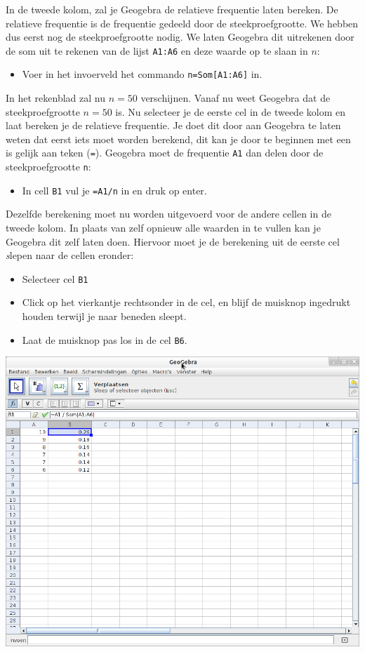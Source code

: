 \documentclass[12pt,twoside]{article}
\begin{document}
In de tweede kolom, zal je Geogebra de relatieve frequentie laten bereken. De relatieve frequentie is de frequentie gedeeld door de steekproefgrootte. We hebben dus eerst nog de steekproefgrootte nodig. We laten Geogebra dit uitrekenen door de som uit te rekenen van de lijst \verb#A1:A6# en deze waarde op te slaan in $n$:
\begin{itemize}
  \item Voer in het invoerveld het commando \verb#n=Som[A1:A6]# in.
\end{itemize}

In het rekenblad zal nu $n=50$ verschijnen. Vanaf nu weet Geogebra dat de steekproefgrootte $n=50$ is. Nu selecteer je de eerste cel in de tweede kolom en laat bereken je de relatieve frequentie. Je doet dit door aan Geogebra te laten weten dat eerst iets moet worden berekend, dit kan je door te beginnen met een is gelijk aan teken (\verb#=#). Geogebra moet de frequentie \verb#A1# dan delen door de steekproefgrootte \verb#n#:
\begin{itemize}
  \item In cell \verb#B1# vul je \verb#=A1/n# in en druk op enter.
\end{itemize}

Dezelfde berekening moet nu worden uitgevoerd voor de andere cellen in de tweede kolom. In plaats van zelf opnieuw alle waarden in te vullen kan je Geogebra dit zelf laten doen. Hiervoor moet je de berekening uit de eerste cel {\emph slepen} naar de cellen eronder:
\begin{itemize}
  \item Selecteer cel \verb#B1#
  \item Click op het vierkantje rechtsonder in de cel, en blijf de muisknop ingedrukt houden terwijl je naar beneden sleept.
  \item Laat de muisknop pas los in de cel \verb#B6#.
\end{itemize}

\begin{center}
  \includegraphics[width=14cm]{gg-relatieve_frequentie.png}
\end{center}
\end{document}
